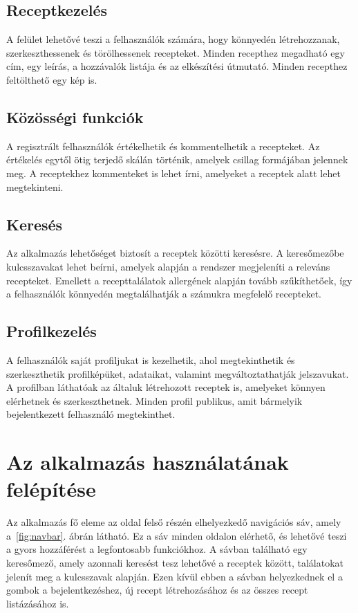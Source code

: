 \subsection{Receptkezelés}
A felület lehetővé teszi a felhasználók számára, hogy könnyedén létrehozzanak, szerkeszthessenek és törölhessenek recepteket. Minden recepthez megadható egy cím, egy leírás, a hozzávalók listája és az elkészítési útmutató. Minden recepthez feltölthető egy kép is.

\subsection{Közösségi funkciók}

A regisztrált felhasználók értékelhetik és kommentelhetik a recepteket. Az értékelés egytől ötig terjedő skálán történik, amelyek csillag formájában jelennek meg. A receptekhez kommenteket is lehet írni, amelyeket a receptek alatt lehet megtekinteni. 
\subsection{Keresés}

Az alkalmazás lehetőséget biztosít a receptek közötti keresésre. A keresőmezőbe kulcsszavakat lehet beírni, amelyek alapján a rendszer megjeleníti a releváns recepteket. Emellett a recepttalálatok allergének alapján tovább szűkíthetőek, így a felhasználók könnyedén megtalálhatják a számukra megfelelő recepteket.

\subsection{Profilkezelés}

A felhasználók saját profiljukat is kezelhetik, ahol megtekinthetik és szerkeszthetik profilképüket, adataikat, valamint megváltoztathatják jelszavukat. A profilban láthatóak az általuk létrehozott receptek is, amelyeket könnyen elérhetnek és szerkeszthetnek. Minden profil publikus, amit bármelyik bejelentkezett felhasználó megtekinthet. 


\section{Az alkalmazás használatának felépítése}

Az alkalmazás fő eleme az oldal felső részén elhelyezkedő navigációs sáv, amely a~\ref{fig:navbar}. ábrán látható. Ez a sáv minden oldalon elérhető, és lehetővé teszi a gyors hozzáférést a legfontosabb funkciókhoz. A sávban található egy keresőmező, amely azonnali keresést tesz lehetővé a receptek között, találatokat jelenít meg a kulcsszavak alapján. Ezen kívül ebben a sávban helyezkednek el a gombok a bejelentkezéshez, új recept létrehozásához és az összes recept listázásához is.

